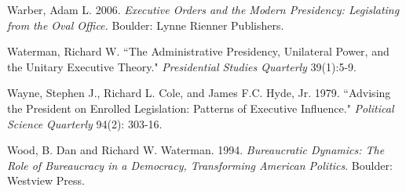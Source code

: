 \documentclass[12pt]{article}
\begin{document}
\noindent \hangindent=0.7cm Warber, Adam L. 2006. \textit{Executive Orders and the Modern Presidency: Legislating from the Oval Office.} Boulder: Lynne Rienner Publishers. 

\noindent \hangindent=0.7cm Waterman, Richard W. ``The Administrative Presidency, Unilateral Power, and the Unitary Executive Theory." \textit{Presidential Studies Quarterly} 39(1):5-9.

\noindent \hangindent=0.7cm Wayne, Stephen J., Richard L. Cole, and James F.C. Hyde, Jr. 1979. ``Advising the President on Enrolled Legislation: Patterns of Executive Influence." \textit{Political Science Quarterly} 94(2): 303-16. 

\noindent \hangindent=0.7cm Wood, B. Dan and Richard W. Waterman. 1994. \textit{Bureaucratic Dynamics: The Role of Bureaucracy in a Democracy, Transforming American Politics}. Boulder: Westview Press. 
\end{document}
